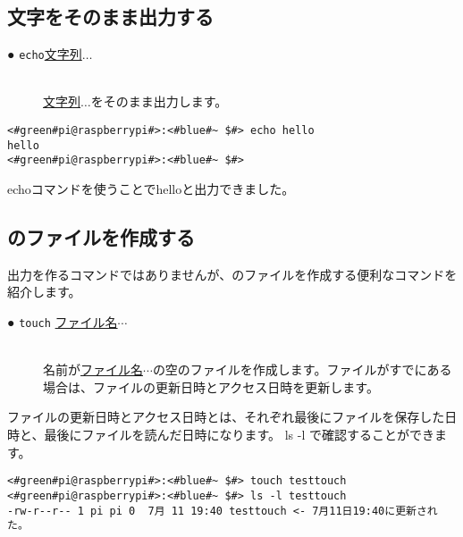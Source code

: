 \subsection{文字をそのまま出力する}
\begin{description}
    \item[● \texttt{echo}\textvisiblespace \underline{文字列}$\ldots$]\mbox{}\\
    \underline{文字列}$\ldots$をそのまま出力します。
    \label{cmd:echo}
\end{description}

\begin{lstlisting}[caption=echoコマンド]
<#green#pi@raspberrypi#>:<#blue#~ $#> echo hello
hello
<#green#pi@raspberrypi#>:<#blue#~ $#>
\end{lstlisting}
echoコマンドを使うことでhelloと出力できました。


\subsection{のファイルを作成する}
出力を作るコマンドではありませんが、のファイルを作成する便利なコマンドを紹介します。

\begin{description}
    \item[● \texttt{touch} \underline{ファイル名}$\cdots$]\mbox{}\\
    名前が\underline{ファイル名}$\cdots$の空のファイルを作成します。ファイルがすでにある場合は、ファイルの更新日時とアクセス日時を更新します。 
\end{description}

ファイルの更新日時とアクセス日時とは、それぞれ最後にファイルを保存した日時と、最後にファイルを読んだ日時になります。 ls -l で確認することができます。
\begin{lstlisting}[caption=空のファイルを作成, label=cmd:touch]
<#green#pi@raspberrypi#>:<#blue#~ $#> touch testtouch
<#green#pi@raspberrypi#>:<#blue#~ $#> ls -l testtouch
-rw-r--r-- 1 pi pi 0  7月 11 19:40 testtouch <- 7月11日19:40に更新された。
\end{lstlisting}

\begin{tcolorbox}[title=\useOmetoi]
    \begin{enumerate}
    \end{enumerate}
\end{tcolorbox}

